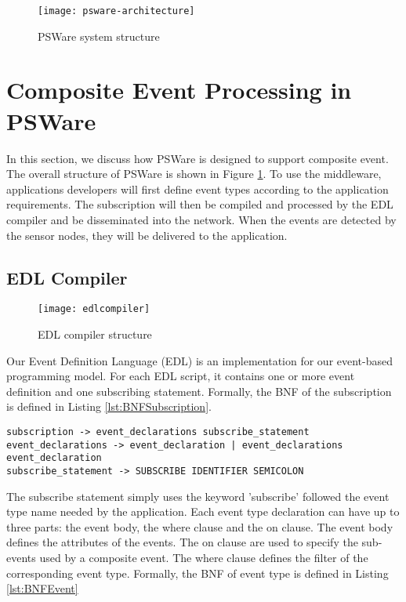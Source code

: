 \begin{figure}
\centering
\texttt{[image: psware-architecture]}
\caption{PSWare system structure}
\label{fig:psware-architecture}
\end{figure}

\section{Composite Event Processing in PSWare}
\label{sec:design}
In this section, we discuss how PSWare is designed to support composite event. The overall structure of PSWare is shown in Figure \ref{fig:psware-architecture}. To use the middleware, applications developers will first define event types according to the application requirements. The subscription will then be compiled and processed by the EDL compiler and be disseminated into the network. When the events are detected by the sensor nodes, they will be delivered to the application.

\subsection{EDL Compiler}
\begin{figure}
\centering
\texttt{[image: edlcompiler]}
\caption{EDL compiler structure}
\label{fig:edlcompiler}
\end{figure}

Our Event Definition Language (EDL) is an implementation for our event-based programming model. For each EDL script, it contains one or more event definition and one subscribing statement. Formally, the BNF of the subscription is defined in Listing \ref{lst:BNFSubscription}.

\begin{lstlisting}[caption=BNF (simplified) of subscription, label=lst:BNFSubscription]
subscription -> event_declarations subscribe_statement
event_declarations -> event_declaration | event_declarations event_declaration
subscribe_statement -> SUBSCRIBE IDENTIFIER SEMICOLON
\end{lstlisting}

The subscribe statement simply uses the keyword 'subscribe' followed the event type name needed by the application. Each event type declaration can have up to three parts: the event body, the where clause and the on clause. The event body defines the attributes of the events. The on clause are used to specify the sub-events used by a composite event. The where clause defines the filter of the corresponding event type. Formally, the BNF of event type is defined in Listing \ref{lst:BNFEvent}

